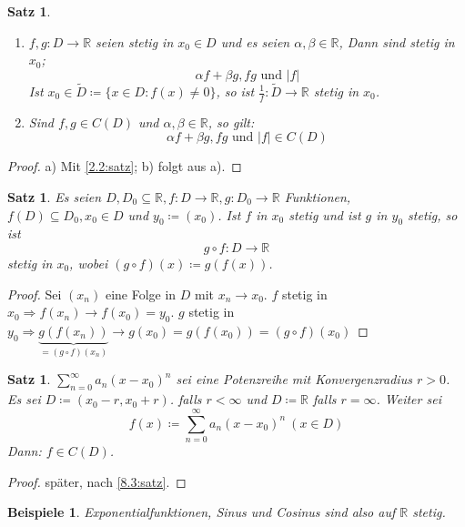 \documentclass[14pt,titlepage,ngerman,a4paper,headsepline,DIV15,halfparskip*]{scrartcl}
\newcommand{\R}{\mathbb{R}}
\theoremstyle{named}
\theoremstyle{dotless}
\newtheorem{satz}[namedtheorem]{Satz}
\newtheorem*{beispiele}{Beispiele}
\begin{document}
\begin{satz} ~\ \label{7.2:satz} 
	\begin{enumerate}
		\item $f, g \colon D \rightarrow \R$ seien stetig in $x_{0} \in D$ und es seien $\alpha, \beta \in \R$, Dann sind stetig in $x_{0}$;
			$$ \alpha f + \beta g, fg \text{ und } |f| $$
			Ist $x_{0} \in \tilde{D} \coloneqq \{ x \in D : f(x) \neq 0 \}$, so ist $\frac{1}{f} \colon \tilde{D} \rightarrow \R$ stetig in $x_{0}$.
		\item Sind $f, g \in C(D)$ und $\alpha, \beta \in \R$, so gilt:
			$$ \alpha f + \beta g, fg \text{ und } |f| \in C(D)$$
	\end{enumerate}
\end{satz}

\begin{proof} a) Mit \ref{2.2:satz}; b) folgt aus a). \end{proof}


\begin{satz} \label{7.3:satz}
	Es seien $D, D_{0} \subseteq \R, f \colon D \rightarrow \R, g \colon D_{0} \rightarrow \R$ Funktionen, $f(D) \subseteq D_{0}, x_{0} \in D$ und $y_{0} \coloneqq(x_{0})$. Ist $f$ in $x_{0}$ stetig und ist $g$ in $y_{0}$ stetig, so ist
			$$ g \circ f \colon D \rightarrow \R $$
		stetig in $x_{0}$, wobei $(g \circ f)(x) \coloneqq g(f(x))$.
\end{satz}

\begin{proof}
	Sei $(x_{n})$ eine Folge in $D$ mit $x_{n} \rightarrow x_{0}$. $f$ stetig in $x_{0} \Rightarrow f(x_{n}) \rightarrow f(x_{0}) = y_{0}$. $g$ stetig in $y_{0} \Rightarrow \underbrace{g(f(x_{n}))}_{= (g \circ f)(x_{n})} \rightarrow g(x_{0}) = g(f(x_{0})) = (g \circ f)(x_{0})$
\end{proof}


\begin{satz} \label{7.4:satz}
	$\sum_{n=0}^{\infty} a_{n} (x - x_{0})^{n}$ sei eine Potenzreihe mit Konvergenzradius $r > 0$. Es sei $D \coloneqq (x_{0} - r, x_{0} + r)$. falls $r < \infty$ und $D \coloneqq \R$ falls $r = \infty$. Weiter sei
		$$ f(x) \coloneqq \sum_{n=0}^{\infty} a_{n} (x - x_{0})^{n} ~(x \in D) $$
	Dann: $f \in C(D)$.	
\end{satz}

\begin{proof}
	später, nach \ref{8.3:satz}.
\end{proof}


\begin{beispiele}
	Exponentialfunktionen, Sinus und Cosinus sind also auf $\R$ stetig.	
\end{beispiele}
\end{document}
